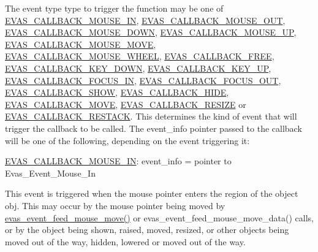 The event type {\ttfamily type} to trigger the function may be one of \hyperlink{Evas_8h_a99e208e463a20499aabe6faac8a8cb8aa598c57bc146639618157159a319f11af}{EVAS\_\-CALLBACK\_\-MOUSE\_\-IN}, \hyperlink{Evas_8h_a99e208e463a20499aabe6faac8a8cb8aa91aaa30a57047d0ee8a734e603751c25}{EVAS\_\-CALLBACK\_\-MOUSE\_\-OUT}, \hyperlink{Evas_8h_a99e208e463a20499aabe6faac8a8cb8aa9fa52651ccf7e47cd3b7785fc4cf393f}{EVAS\_\-CALLBACK\_\-MOUSE\_\-DOWN}, \hyperlink{Evas_8h_a99e208e463a20499aabe6faac8a8cb8aa8c1b22c99dd0231cd9ba1fecbffffac7}{EVAS\_\-CALLBACK\_\-MOUSE\_\-UP}, \hyperlink{Evas_8h_a99e208e463a20499aabe6faac8a8cb8aa23fb97fb7cbccded54ccf3fc4e1dab8a}{EVAS\_\-CALLBACK\_\-MOUSE\_\-MOVE}, \hyperlink{Evas_8h_a99e208e463a20499aabe6faac8a8cb8aa39d739f473db520ec4dfe0776ed43be4}{EVAS\_\-CALLBACK\_\-MOUSE\_\-WHEEL}, \hyperlink{Evas_8h_a99e208e463a20499aabe6faac8a8cb8aaab869b5d534f02f1b3e151e2406a8c24}{EVAS\_\-CALLBACK\_\-FREE}, \hyperlink{Evas_8h_a99e208e463a20499aabe6faac8a8cb8aa336b86bad4f145f84c155e4922335584}{EVAS\_\-CALLBACK\_\-KEY\_\-DOWN}, \hyperlink{Evas_8h_a99e208e463a20499aabe6faac8a8cb8aac436b50ad665089f8a24b0fb827cec5f}{EVAS\_\-CALLBACK\_\-KEY\_\-UP}, \hyperlink{Evas_8h_a99e208e463a20499aabe6faac8a8cb8aa819cf61e9d11012b7402338c2ccb7b97}{EVAS\_\-CALLBACK\_\-FOCUS\_\-IN}, \hyperlink{Evas_8h_a99e208e463a20499aabe6faac8a8cb8aab26a0af7efaa8b77e996bd438accf8d3}{EVAS\_\-CALLBACK\_\-FOCUS\_\-OUT}, \hyperlink{Evas_8h_a99e208e463a20499aabe6faac8a8cb8aab433c293bd272670ac3b5e8b1928a540}{EVAS\_\-CALLBACK\_\-SHOW}, \hyperlink{Evas_8h_a99e208e463a20499aabe6faac8a8cb8aa635d910ff45c89f4d7b91630add35cd7}{EVAS\_\-CALLBACK\_\-HIDE}, \hyperlink{Evas_8h_a99e208e463a20499aabe6faac8a8cb8aa9b66bd091da76fb13f551c6db04502b0}{EVAS\_\-CALLBACK\_\-MOVE}, \hyperlink{Evas_8h_a99e208e463a20499aabe6faac8a8cb8aa554e3341a4ae95e15d42da495f8adb21}{EVAS\_\-CALLBACK\_\-RESIZE} or \hyperlink{Evas_8h_a99e208e463a20499aabe6faac8a8cb8aae633ea84ed0fccd3a3b232d0da30b145}{EVAS\_\-CALLBACK\_\-RESTACK}. This determines the kind of event that will trigger the callback to be called. The {\ttfamily event\_\-info} pointer passed to the callback will be one of the following, depending on the event triggering it:

\hyperlink{Evas_8h_a99e208e463a20499aabe6faac8a8cb8aa598c57bc146639618157159a319f11af}{EVAS\_\-CALLBACK\_\-MOUSE\_\-IN}: event\_\-info = pointer to Evas\_\-Event\_\-Mouse\_\-In

This event is triggered when the mouse pointer enters the region of the object {\ttfamily obj}. This may occur by the mouse pointer being moved by \hyperlink{group__Evas__Event__Feeding__Group_ga480017cad2b8982bee7a894433aff2f7}{evas\_\-event\_\-feed\_\-mouse\_\-move()} or evas\_\-event\_\-feed\_\-mouse\_\-move\_\-data() calls, or by the object being shown, raised, moved, resized, or other objects being moved out of the way, hidden, lowered or moved out of the way.

